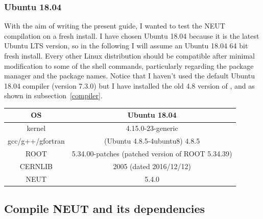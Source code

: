 \subsubsection{Ubuntu 18.04}
With the aim of writing the present guide, I wanted to test
the NEUT compilation on a fresh install. I have chosen Ubuntu 18.04
because it is the latest Ubuntu LTS version, so in the following I
will assume an Ubuntu 18.04 64 bit fresh install.  Every other Linux
distribution should be compatible after minimal modification to some
of the shell commands, particularly regarding the package manager and
the package names. Notice that I haven't used the default Ubuntu 18.04
compiler (version 7.3.0) but I have installed the old 4.8 version of
,  and  as shown
in subsection~\ref{compiler}. 
\begin{center}
  \begin{tabular}{||c | c||} %
    \hline %
    OS & Ubuntu 18.04 \\ [0.5ex] 
    \hline\hline %
    kernel & 4.15.0-23-generic \\ 
    \hline %
    gcc/g++/gfortran & (Ubuntu 4.8.5-4ubuntu8) 4.8.5 \\
    \hline %
    ROOT & 5.34.00-patches (patched version of ROOT 5.34.39) \\
    \hline %
    CERNLIB & 2005 (dated 2016/12/12) \\
    \hline %
    NEUT & 5.4.0 \\ [1ex] 
    \hline
  \end{tabular}
\end{center}

\subsection{Compile NEUT and its dependencies}

